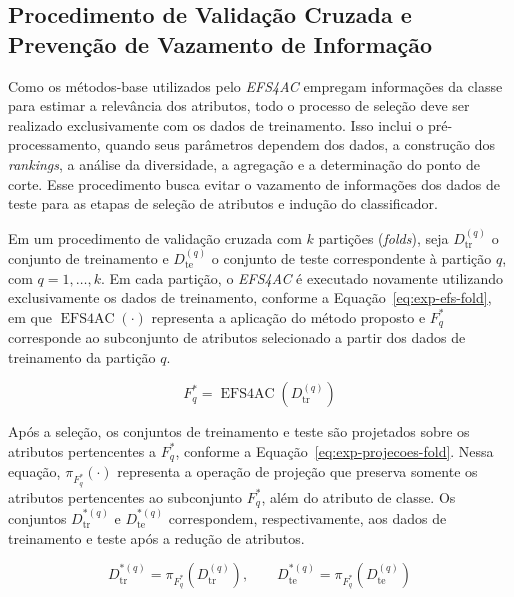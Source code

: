 \subsection{Procedimento de Validação Cruzada e Prevenção de Vazamento de Informação}\label{subsec:exp-validacao}

Como os métodos-base utilizados pelo \textit{EFS4AC} empregam informações
da classe para estimar a relevância dos atributos, todo o processo de
seleção deve ser realizado exclusivamente com os dados de treinamento.
Isso inclui o pré-processamento, quando seus parâmetros
dependem dos dados, a construção dos \textit{rankings}, a análise da
diversidade, a agregação e a determinação do ponto de corte. Esse
procedimento busca evitar o vazamento de informações dos dados de teste
para as etapas de seleção de atributos e indução do classificador.

Em um procedimento de validação cruzada com $k$ partições
(\textit{folds}), seja $D_{\mathrm{tr}}^{(q)}$ o conjunto de treinamento
e $D_{\mathrm{te}}^{(q)}$ o conjunto de teste correspondente à
partição $q$, com $q=1,\ldots,k$. Em cada partição, o
\textit{EFS4AC} é executado novamente utilizando exclusivamente
os dados de treinamento, conforme a Equação~\ref{eq:exp-efs-fold}, em que $\operatorname{EFS4AC}(\cdot)$ representa a aplicação do método
proposto e $F_q^{*}$ corresponde ao subconjunto de atributos selecionado
a partir dos dados de treinamento da partição $q$.

\begin{equation}\label{eq:exp-efs-fold}
    F_q^{*} =
    \operatorname{EFS4AC}(D_{\mathrm{tr}}^{(q)})
\end{equation}

Após a seleção, os conjuntos de treinamento e teste são projetados
sobre os atributos pertencentes a $F_q^{*}$, conforme a
Equação~\ref{eq:exp-projecoes-fold}. Nessa equação, $\pi_{F_q^{*}}(\cdot)$ representa a operação de projeção
que preserva somente os atributos pertencentes ao subconjunto
$F_q^{*}$, além do atributo de classe.
Os conjuntos $D_{\mathrm{tr}}^{*(q)}$ e $D_{\mathrm{te}}^{*(q)}$
correspondem, respectivamente, aos dados de treinamento e teste
após a redução de atributos.

\begin{equation}\label{eq:exp-projecoes-fold}
    D_{\mathrm{tr}}^{*(q)}
    =
    \pi_{F_q^{*}}(D_{\mathrm{tr}}^{(q)}),
    \qquad
    D_{\mathrm{te}}^{*(q)}
    =
    \pi_{F_q^{*}}(D_{\mathrm{te}}^{(q)})
\end{equation}

